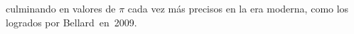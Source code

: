 \documentclass[preview]{standalone}
\begin{document}
\begin{center}
culminando en valores de $\pi$ cada vez más precisos en la era moderna, como los logrados por Bellard en 2009.
\end{center}
\end{document}

